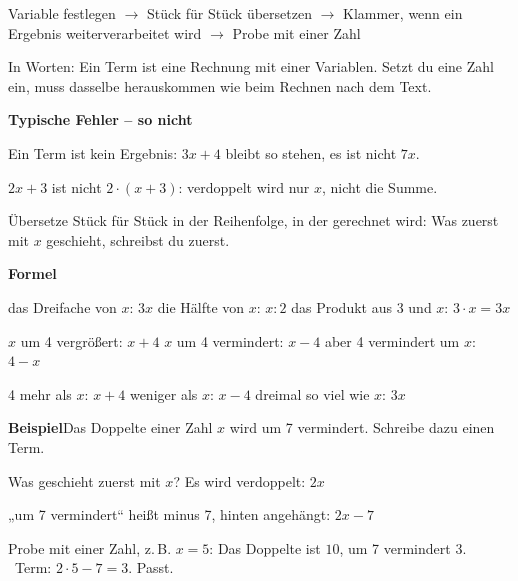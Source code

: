 \documentclass[11pt]{article}
\newcommand{\nr}[1]{\makebox[7mm][l]{\textbf{#1}}}
\begin{document}
\begin{tcolorbox}[colback=mbkasten,colframe=mbgrau,boxrule=0.5pt,arc=1mm,left=3mm,right=3mm,top=2mm,bottom=2mm,title={\bfseries Formel auf einen Blick},coltitle=black,colbacktitle=black!10]
{\Large Variable festlegen $\to$ Stück für Stück übersetzen $\to$ Klammer, wenn ein Ergebnis weiterverarbeitet wird $\to$ Probe mit einer Zahl}\par\medskip
In Worten: Ein Term ist eine Rechnung mit einer Variablen. Setzt du eine Zahl ein, muss dasselbe herauskommen wie beim Rechnen nach dem Text.\par\medskip
\end{tcolorbox}
\medskip\noindent\textbf{Typische Fehler – so nicht}\par\smallskip
\noindent\nr{$\times$}Ein Term ist kein Ergebnis: $3x + 4$ bleibt so stehen, es ist nicht $7x$.\par
\noindent\nr{$\times$}$2x + 3$ ist nicht $2 \cdot (x + 3)$: verdoppelt wird nur $x$, nicht die Summe.\par
\clearpage\label{s:A}\noindent\colorbox{black!12}{}\hspace{3mm}{\Large\bfseries Rechenwörter in Terme übersetzen}\par\smallskip
\noindent Übersetze Stück für Stück in der Reihenfolge, in der gerechnet wird: Was zuerst mit $x$ geschieht, schreibst du zuerst.\par\medskip
\noindent\textbf{Formel}\par\nopagebreak\noindent\hspace*{4mm}\begin{minipage}{\dimexpr\linewidth-4mm\relax}das Dreifache von $x$: $3x$ \quad die Hälfte von $x$: $x : 2$ \quad das Produkt aus 3 und $x$: $3 \cdot x = 3x$ \par\vspace{3pt} $x$ um 4 vergrößert: $x + 4$ \quad $x$ um 4 vermindert: $x - 4$ \quad aber 4 vermindert um $x$: $4 - x$ \par\vspace{3pt} 4 mehr als $x$: $x + 4$  weniger als $x$: $x - 4$ \quad dreimal so viel wie $x$: $3x$\end{minipage}\par\medskip
\noindent\textbf{Beispiel}\quad Das Doppelte einer Zahl $x$ wird um 7 vermindert. Schreibe dazu einen Term.\par\smallskip
\noindent\par\noindent{}Was geschieht zuerst mit $x$? Es wird verdoppelt: \quad $2x$\par\smallskip\par\noindent{}„um 7 vermindert“ heißt minus 7, hinten angehängt: \quad $2x - 7$\par\smallskip\par\noindent{}Probe mit einer Zahl, z.\,B. $x = 5$: Das Doppelte ist $10$, um 7 vermindert $3$. \ Term: $2 \cdot 5 - 7 = 3$. Passt.\par\smallskip\par\medskip
\end{document}
